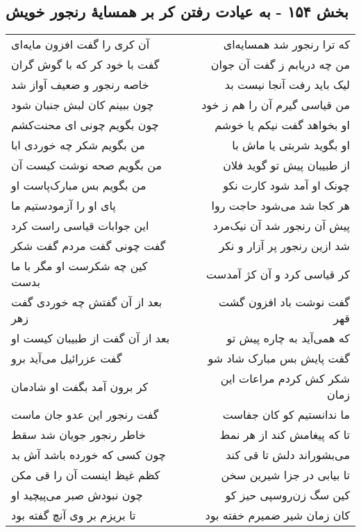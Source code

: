 \begin{center}
\section*{بخش ۱۵۴ - به عیادت رفتن کر بر همسایهٔ رنجور خویش}
\label{sec:sh154}
\begin{longtable}{l p{0.5cm} r}
آن کری را گفت افزون مایه‌ای
&&
که ترا رنجور شد همسایه‌ای
\\
گفت با خود کر که با گوش گران
&&
من چه دریابم ز گفت آن جوان
\\
خاصه رنجور و ضعیف آواز شد
&&
لیک باید رفت آنجا نیست بد
\\
چون ببینم کان لبش جنبان شود
&&
من قیاسی گیرم آن را هم ز خود
\\
چون بگویم چونی ای محنت‌کشم
&&
او بخواهد گفت نیکم یا خوشم
\\
من بگویم شکر چه خوردی ابا
&&
او بگوید شربتی یا ماش با
\\
من بگویم صحه نوشت کیست آن
&&
از طبیبان پیش تو گوید فلان
\\
من بگویم بس مبارک‌پاست او
&&
چونک او آمد شود کارت نکو
\\
پای او را آزمودستیم ما
&&
هر کجا شد می‌شود حاجت روا
\\
این جوابات قیاسی راست کرد
&&
پیش آن رنجور شد آن نیک‌مرد
\\
گفت چونی گفت مردم گفت شکر
&&
شد ازین رنجور پر آزار و نکر
\\
کین چه شکرست او مگر با ما بدست
&&
کر قیاسی کرد و آن کژ آمدست
\\
بعد از آن گفتش چه خوردی گفت زهر
&&
گفت نوشت باد افزون گشت قهر
\\
بعد از آن گفت از طبیبان کیست او
&&
که همی‌آید به چاره پیش تو
\\
گفت عزرائیل می‌آید برو
&&
گفت پایش بس مبارک شاد شو
\\
کر برون آمد بگفت او شادمان
&&
شکر کش کردم مراعات این زمان
\\
گفت رنجور این عدو جان ماست
&&
ما ندانستیم کو کان جفاست
\\
خاطر رنجور جویان شد سقط
&&
تا که پیغامش کند از هر نمط
\\
چون کسی که خورده باشد آش بد
&&
می‌بشوراند دلش تا قی کند
\\
کظم غیظ اینست آن را قی مکن
&&
تا بیابی در جزا شیرین سخن
\\
چون نبودش صبر می‌پیچید او
&&
کین سگ زن‌روسپی حیز کو
\\
تا بریزم بر وی آنچ گفته بود
&&
کان زمان شیر ضمیرم خفته بود
\\

\end{longtable}
\end{center}
